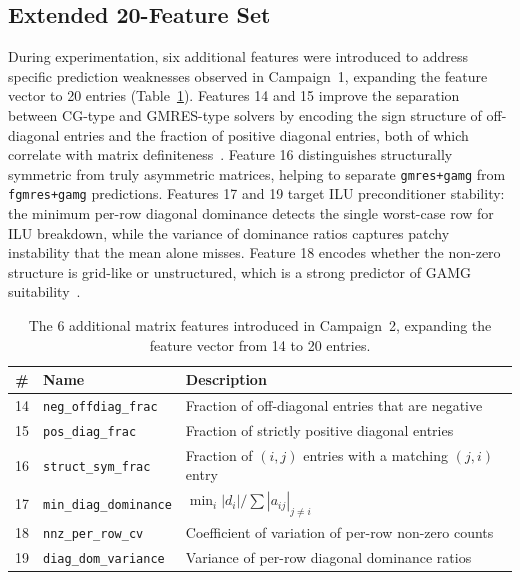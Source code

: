 \subsection{Extended 20-Feature Set}\label{subsec:features-20}

During experimentation, six additional features were introduced to address specific prediction weaknesses observed in Campaign~1,
expanding the feature vector to 20 entries (Table~\ref{tab:features-6}).
Features 14 and 15 improve the separation between CG-type and GMRES-type solvers by encoding the sign structure of off-diagonal
entries and the fraction of positive diagonal entries, both of which correlate with matrix definiteness~\cite{saad2003iterative}.
Feature 16 distinguishes structurally symmetric from truly asymmetric matrices, helping to separate \texttt{gmres+gamg} from \texttt{fgmres+gamg} predictions.
Features 17 and 19 target ILU preconditioner stability: the minimum per-row diagonal dominance detects the single worst-case
row for ILU breakdown, while the variance of dominance ratios captures patchy instability that the mean alone misses.
Feature 18 encodes whether the non-zero structure is grid-like or unstructured, which is a strong predictor of GAMG suitability~\cite{stuben2001review}.

\begin{table}[H]
  \centering
  \caption[Six additional matrix features introduced in Campaign~2.]{The 6 additional matrix features introduced in Campaign~2, expanding the feature vector from 14 to 20 entries.}
  \label{tab:features-6}
  \begin{tabular}{cll}
    \toprule
    \textbf{\#} & \textbf{Name} & \textbf{Description} \\
    \midrule
    14 & \texttt{neg\_offdiag\_frac}   & Fraction of off-diagonal entries that are negative \\
    15 & \texttt{pos\_diag\_frac}      & Fraction of strictly positive diagonal entries \\
    16 & \texttt{struct\_sym\_frac}    & Fraction of $(i,j)$ entries with a matching $(j,i)$ entry \\
    17 & \texttt{min\_diag\_dominance} & $\min_i |d_i| / \sum|a_{ij}|_{j \neq i}$ \\
    18 & \texttt{nnz\_per\_row\_cv}    & Coefficient of variation of per-row non-zero counts \\
    19 & \texttt{diag\_dom\_variance}  & Variance of per-row diagonal dominance ratios \\
    \bottomrule
  \end{tabular}
\end{table}

